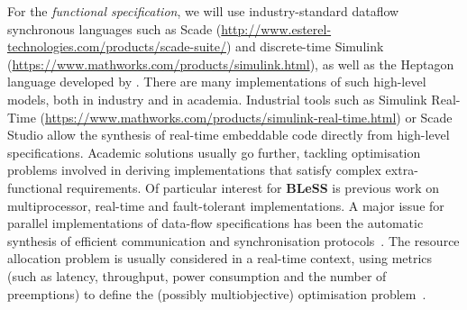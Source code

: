 \documentclass[a4paper,11pt]{article}
\newcommand{\project}[1]{\textbf{#1}\xspace}
\newcommand{\BLESS}{\project{BLeSS}}
\newcommand{\TheProject}{\BLESS}
\begin{document}
For the \emph{functional specification}, we will use industry-standard
dataflow synchronous languages such as 
Scade (\url{http://www.esterel-technologies.com/products/scade-suite/})
and discrete-time
Simulink (\url{https://www.mathworks.com/products/simulink.html}),
as well as the Heptagon language developed by \INRIAshort. 
There are many implementations of such high-level models, both in
industry and in academia. Industrial tools such as Simulink
Real-Time (\url{https://www.mathworks.com/products/simulink-real-time.html})
or Scade Studio allow the synthesis of real-time embeddable code
directly from high-level specifications.
%
Academic solutions usually go further, tackling optimisation problems
involved in deriving implementations that satisfy complex
extra-functional requirements. Of particular interest for \TheProject
is previous work on multiprocessor, real-time and fault-tolerant
implementations. A major issue for parallel implementations of
data-flow specifications has been the automatic synthesis of 
efficient communication and synchronisation protocols~\cite{syndex,ocrep,weakendo}.
%
%
The resource allocation problem is usually considered in a real-time
context, using metrics (such as latency, throughput, power consumption
and the number of preemptions) to define the (possibly multiobjective)
optimisation problem~\cite{lopht1,lopht3}.
\end{document}

